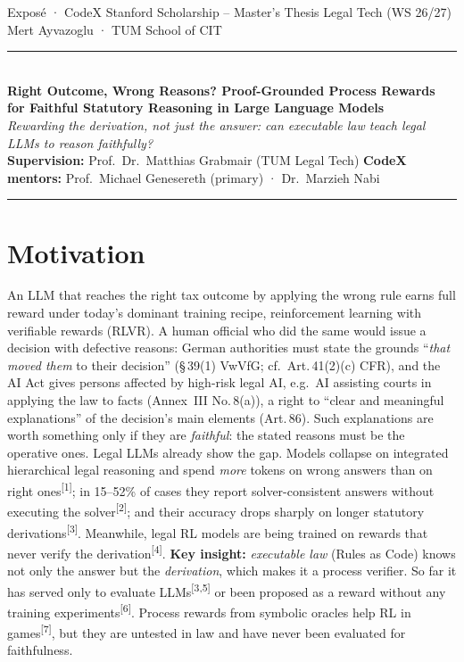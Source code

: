 \documentclass[10pt,a4paper]{article}
\newcommand{\cit}[1]{\textsuperscript{\color{muted}[#1]}}
\begin{document}
{\footnotesize\color{muted} Exposé · CodeX Stanford Scholarship – Master's Thesis Legal Tech (WS 26/27) \hfill Mert Ayvazoglu · TUM School of CIT}\\[-2pt]
{\color{accent}\rule{\linewidth}{0.8pt}}\\[0pt]
{\fontsize{13.2}{15}\selectfont\bfseries Right Outcome, Wrong Reasons? Proof-Grounded Process Rewards\\[-1pt] for Faithful Statutory Reasoning in Large Language Models}\\[1.5pt]
{\small\itshape Rewarding the derivation, not just the answer: can executable law teach legal LLMs to reason faithfully?}\\[1pt]
{\small\textbf{Supervision:} Prof.\ Dr.\ Matthias Grabmair (TUM Legal Tech) \hfill
\textbf{CodeX mentors:} Prof.\ Michael Genesereth (primary) · Dr.\ Marzieh Nabi}\\[-3pt]
{\color{accent}\rule{\linewidth}{0.4pt}}

\section{Motivation}
An LLM that reaches the right tax outcome by applying the wrong rule earns full reward under today's dominant training recipe, reinforcement learning with verifiable rewards (RLVR). A human official who did the same would issue a decision with defective reasons: German authorities must state the grounds ``\emph{that moved them} to their decision'' (§\,39(1) VwVfG; cf.\ Art.\,41(2)(c) CFR), and the AI Act gives persons affected by high-risk legal AI, e.g.\ AI assisting courts in applying the law to facts (Annex~III No.\,8(a)), a right to ``clear and meaningful explanations'' of the decision's main elements (Art.\,86). Such explanations are worth something only if they are \emph{faithful}: the stated reasons must be the operative ones. Legal LLMs already show the gap. Models collapse on integrated hierarchical legal reasoning and spend \emph{more} tokens on wrong answers than on right ones\cit{1}; in 15–52\% of cases they report solver-consistent answers without executing the solver\cit{2}; and their accuracy drops sharply on longer statutory derivations\cit{3}. Meanwhile, legal RL models are being trained on rewards that never verify the derivation\cit{4}. \textbf{Key insight:} \emph{executable law} (Rules as Code) knows not only the answer but the \emph{derivation}, which makes it a process verifier. So far it has served only to evaluate LLMs\cit{3,5} or been proposed as a reward without any training experiments\cit{6}. Process rewards from symbolic oracles help RL in games\cit{7}, but they are untested in law and have never been evaluated for faithfulness.
\end{document}
